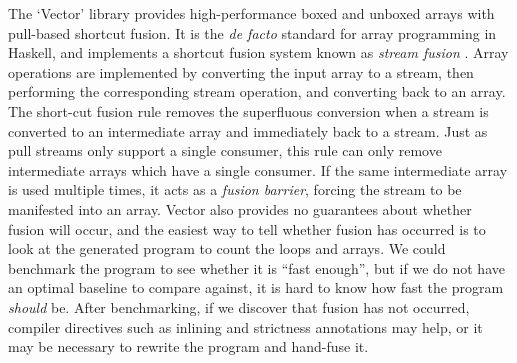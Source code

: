 The `Vector' library provides high-performance boxed and unboxed arrays with pull-based shortcut fusion.
It is the \emph{de facto} standard for array programming in Haskell, and implements a shortcut fusion system known as \emph{stream fusion} \citep{coutts2007stream}.
Array operations are implemented by converting the input array to a stream, then performing the corresponding stream operation, and converting back to an array.
The short-cut fusion rule removes the superfluous conversion when a stream is converted to an intermediate array and immediately back to a stream.
Just as pull streams only support a single consumer, this rule can only remove intermediate arrays which have a single consumer.
If the same intermediate array is used multiple times, it acts as a \emph{fusion barrier}, forcing the stream to be manifested into an array.
Vector also provides no guarantees about whether fusion will occur, and the easiest way to tell whether fusion has occurred is to look at the generated program to count the loops and arrays.
We could benchmark the program to see whether it is ``fast enough'', but if we do not have an optimal baseline to compare against, it is hard to know how fast the program \emph{should} be.
After benchmarking, if we discover that fusion has not occurred, compiler directives such as inlining and strictness annotations may help, or it may be necessary to rewrite the program and hand-fuse it.



